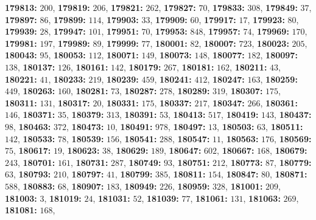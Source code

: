 \textsf{\bfseries 179813:} $200$, \textsf{\bfseries 179819:} $206$, \textsf{\bfseries 179821:} $262$, \textsf{\bfseries 179827:} $70$, \textsf{\bfseries 179833:} $308$, \textsf{\bfseries 179849:} $37$, \textsf{\bfseries 179897:} $86$, \textsf{\bfseries 179899:} $114$, \textsf{\bfseries 179903:} $33$, \textsf{\bfseries 179909:} $60$, \textsf{\bfseries 179917:} $17$, \textsf{\bfseries 179923:} $80$, \textsf{\bfseries 179939:} $28$, \textsf{\bfseries 179947:} $101$, \textsf{\bfseries 179951:} $70$, \textsf{\bfseries 179953:} $848$, \textsf{\bfseries 179957:} $74$, \textsf{\bfseries 179969:} $170$, \textsf{\bfseries 179981:} $197$, \textsf{\bfseries 179989:} $89$, \textsf{\bfseries 179999:} $77$, \textsf{\bfseries 180001:} $82$, \textsf{\bfseries 180007:} $723$, \textsf{\bfseries 180023:} $205$, \textsf{\bfseries 180043:} $95$, \textsf{\bfseries 180053:} $112$, \textsf{\bfseries 180071:} $149$, \textsf{\bfseries 180073:} $148$, \textsf{\bfseries 180077:} $182$, \textsf{\bfseries 180097:} $138$, \textsf{\bfseries 180137:} $126$, \textsf{\bfseries 180161:} $142$, \textsf{\bfseries 180179:} $267$, \textsf{\bfseries 180181:} $162$, \textsf{\bfseries 180211:} $43$, \textsf{\bfseries 180221:} $41$, \textsf{\bfseries 180233:} $219$, \textsf{\bfseries 180239:} $459$, \textsf{\bfseries 180241:} $412$, \textsf{\bfseries 180247:} $163$, \textsf{\bfseries 180259:} $449$, \textsf{\bfseries 180263:} $160$, \textsf{\bfseries 180281:} $73$, \textsf{\bfseries 180287:} $278$, \textsf{\bfseries 180289:} $319$, \textsf{\bfseries 180307:} $175$, \textsf{\bfseries 180311:} $131$, \textsf{\bfseries 180317:} $20$, \textsf{\bfseries 180331:} $175$, \textsf{\bfseries 180337:} $217$, \textsf{\bfseries 180347:} $266$, \textsf{\bfseries 180361:} $146$, \textsf{\bfseries 180371:} $35$, \textsf{\bfseries 180379:} $313$, \textsf{\bfseries 180391:} $53$, \textsf{\bfseries 180413:} $517$, \textsf{\bfseries 180419:} $143$, \textsf{\bfseries 180437:} $98$, \textsf{\bfseries 180463:} $372$, \textsf{\bfseries 180473:} $10$, \textsf{\bfseries 180491:} $978$, \textsf{\bfseries 180497:} $13$, \textsf{\bfseries 180503:} $63$, \textsf{\bfseries 180511:} $142$, \textsf{\bfseries 180533:} $78$, \textsf{\bfseries 180539:} $156$, \textsf{\bfseries 180541:} $288$, \textsf{\bfseries 180547:} $11$, \textsf{\bfseries 180563:} $176$, \textsf{\bfseries 180569:} $75$, \textsf{\bfseries 180617:} $19$, \textsf{\bfseries 180623:} $38$, \textsf{\bfseries 180629:} $189$, \textsf{\bfseries 180647:} $602$, \textsf{\bfseries 180667:} $168$, \textsf{\bfseries 180679:} $243$, \textsf{\bfseries 180701:} $161$, \textsf{\bfseries 180731:} $287$, \textsf{\bfseries 180749:} $93$, \textsf{\bfseries 180751:} $212$, \textsf{\bfseries 180773:} $87$, \textsf{\bfseries 180779:} $63$, \textsf{\bfseries 180793:} $210$, \textsf{\bfseries 180797:} $41$, \textsf{\bfseries 180799:} $385$, \textsf{\bfseries 180811:} $154$, \textsf{\bfseries 180847:} $80$, \textsf{\bfseries 180871:} $588$, \textsf{\bfseries 180883:} $68$, \textsf{\bfseries 180907:} $183$, \textsf{\bfseries 180949:} $226$, \textsf{\bfseries 180959:} $328$, \textsf{\bfseries 181001:} $209$, \textsf{\bfseries 181003:} $3$, \textsf{\bfseries 181019:} $24$, \textsf{\bfseries 181031:} $52$, \textsf{\bfseries 181039:} $77$, \textsf{\bfseries 181061:} $131$, \textsf{\bfseries 181063:} $269$, \textsf{\bfseries 181081:} $168$, 
